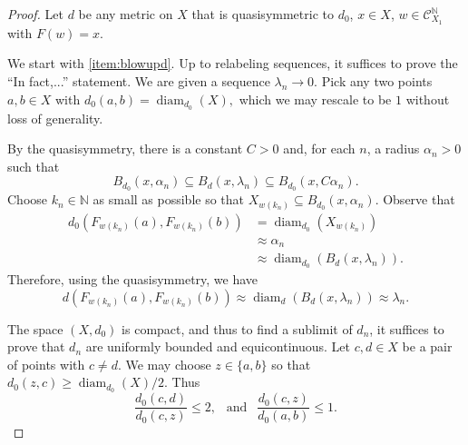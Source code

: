 \documentclass{amsart}
\DeclareMathOperator{\diam}{diam}
\theoremstyle{plain}
\theoremstyle{definition}
\numberwithin{equation}{section}
\numberwithin{theorem}{section}
\begin{document}
\begin{proof} 

Let $d$ be any metric on $X$ that is quasisymmetric to $d_0$, $x\in X$, $w\in \mathcal{C}_{X_1}^\mathbb{N}$ with $F(w)=x$. 

We start with \eqref{item:blowupd}. Up to relabeling sequences, it suffices to prove the ``In fact,...'' statement. We are given a sequence $\lambda_n \rightarrow 0$. Pick any two points $a,b\in X$ with $d_0(a,b)=\diam_{d_0}(X),$ which we may rescale to be $1$ without loss of generality.

By the quasisymmetry, there is a constant $C>0$ and, for each $n$, a radius $\alpha_n>0$ such that
\begin{equation}\label{eq:ballS}
B_{d_0}(x,\alpha_n) \subseteq B_d(x,\lambda_n) \subseteq B_{d_0}(x, C\alpha_n).
\end{equation}
Choose $k_n\in\mathbb{N}$ as small as possible so that $ X_{w(k_n)} \subseteq B_{d_0}(x,\alpha_n)$. 
Observe that
\begin{align*}
d_0(F_{w(k_n)}(a), F_{w(k_n)}(b))&= \diam_{d_0}(X_{w(k_n)})\\
&\approx \alpha_n\\
&\approx \diam_{d_0}(B_d(x,\lambda_n)).
\end{align*}
Therefore, using the quasisymmetry, we have
\begin{equation}\label{eq:dnbound}
d(F_{w(k_n)}(a), F_{w(k_n)}(b))
\approx \diam_d(B_d(x,\lambda_n))
\approx \lambda_n.
\end{equation}


The space $(X,d_0)$ is compact, and thus to find a sublimit of $d_n$, it suffices to prove that $d_n$ are uniformly bounded and equicontinuous. Let $c,d\in X$ be a pair of points with $c\neq d$. We may choose $z\in\{a,b\}$ so that $d_0(z,c)\geq \diam_{d_0}(X)/2$. Thus
\[
\frac{d_0(c,d)}{d_0(c,z)}\leq 2, \ \ \text{  and  } \ \ \frac{d_0(c,z)}{d_0(a,b)}\leq 1.
\]


\end{proof}
\end{document}
